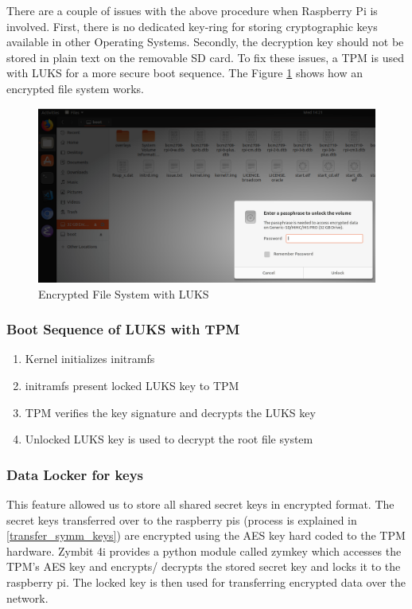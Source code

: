 \documentclass[11pt,openright]{report}
\begin{document}
There are a couple of issues with the above procedure when Raspberry Pi is involved. First, there is no dedicated key-ring for storing cryptographic keys available in other Operating Systems. Secondly, the decryption key should not be stored in plain text on the removable SD card. To fix these issues, a TPM is used with LUKS \cite{TPMLUKS} for a more secure boot sequence. The Figure \ref{fig:encrypted_fs} shows how an encrypted file system works.

\begin{figure}
	\centering
	\includegraphics[scale=0.5]{images/2_LUKSEncryptedFormat.png}
	\caption{Encrypted File System with LUKS}
	\label{fig:encrypted_fs}
\end{figure}

\subsubsection{Boot Sequence of LUKS with TPM}
\begin{enumerate}
	\item Kernel initializes initramfs
	\item initramfs present locked LUKS key to TPM
	\item TPM verifies the key signature and decrypts the LUKS key
	\item Unlocked LUKS key is used to decrypt the root file system
\end{enumerate}

\subsubsection{Data Locker for keys}
This feature allowed us to store all shared secret keys in encrypted format. The secret keys transferred over to the raspberry pis (process is explained in \ref{transfer_symm_keys}) are encrypted using the AES key hard coded to the TPM hardware. Zymbit 4i provides a python module called zymkey which accesses the TPM's AES key and encrypts/ decrypts the stored secret key and locks it to the raspberry pi. The locked key is then used for transferring encrypted data over the network.
\end{document}
